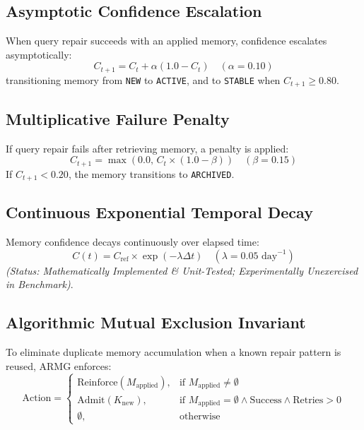 \documentclass[conference]{IEEEtran}
\begin{document}
\subsection{Asymptotic Confidence Escalation}
When query repair succeeds with an applied memory, confidence escalates asymptotically:
\begin{equation}
C_{t+1} = C_t + \alpha (1.0 - C_t) \quad (\alpha = 0.10)
\end{equation}
transitioning memory from \texttt{NEW} to \texttt{ACTIVE}, and to \texttt{STABLE} when $C_{t+1} \ge 0.80$.

\subsection{Multiplicative Failure Penalty}
If query repair fails after retrieving memory, a penalty is applied:
\begin{equation}
C_{t+1} = \max(0.0, \, C_t \times (1.0 - \beta)) \quad (\beta = 0.15)
\end{equation}
If $C_{t+1} < 0.20$, the memory transitions to \texttt{ARCHIVED}.

\subsection{Continuous Exponential Temporal Decay}
Memory confidence decays continuously over elapsed time:
\begin{equation}
C(t) = C_{\text{ref}} \times \exp(-\lambda \Delta t) \quad (\lambda = 0.05 \text{ day}^{-1})
\end{equation}
\textit{(Status: Mathematically Implemented \& Unit-Tested; Experimentally Unexercised in Benchmark)}.

\subsection{Algorithmic Mutual Exclusion Invariant}
To eliminate duplicate memory accumulation when a known repair pattern is reused, ARMG enforces:
\begin{equation}
\text{Action} = \begin{cases} 
\text{Reinforce}(M_{\text{applied}}), & \text{if } M_{\text{applied}} \neq \emptyset \\ 
\text{Admit}(K_{\text{new}}), & \text{if } M_{\text{applied}} = \emptyset \land \text{Success} \land \text{Retries} > 0 \\ 
\emptyset, & \text{otherwise} 
\end{cases}
\end{equation}
\end{document}
